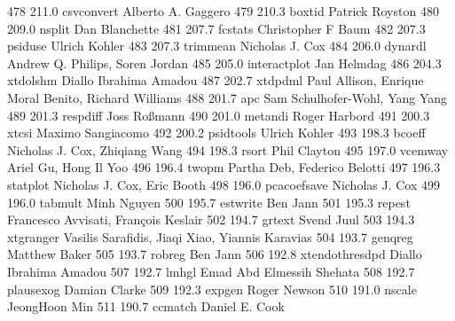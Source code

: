    478    211.0    csvconvert    Alberto A. Gaggero                      
   479    210.3    boxtid        Patrick Royston                         
   480    209.0    nsplit        Dan Blanchette                          
   481    207.7    fcstats       Christopher F Baum                      
   482    207.3    psiduse       Ulrich Kohler                           
   483    207.3    trimmean      Nicholas J. Cox                         
   484    206.0    dynardl       Andrew Q. Philips, Soren Jordan         
   485    205.0    interactplot  Jan Helmdag                             
   486    204.3    xtdolshm      Diallo Ibrahima Amadou                  
   487    202.7    xtdpdml       Paul Allison, Enrique Moral Benito,     
                                   Richard Williams                        
   488    201.7    apc           Sam Schulhofer-Wohl, Yang Yang          
   489    201.3    respdiff      Joss Roßmann                           
   490    201.0    metandi       Roger Harbord                           
   491    200.3    xtcsi         Maximo Sangiacomo                       
   492    200.2    psidtools     Ulrich Kohler                           
   493    198.3    bcoeff        Nicholas J. Cox, Zhiqiang Wang          
   494    198.3    rsort         Phil Clayton                            
   495    197.0    vcemway       Ariel Gu, Hong Il Yoo                   
   496    196.4    twopm         Partha Deb, Federico Belotti            
   497    196.3    statplot      Nicholas J. Cox, Eric Booth             
   498    196.0    pcacoefsave   Nicholas J. Cox                         
   499    196.0    tabmult       Minh Nguyen                             
   500    195.7    estwrite      Ben Jann                                
   501    195.3    repest        Francesco Avvisati, François Keslair   
   502    194.7    grtext        Svend Juul                              
   503    194.3    xtgranger     Vasilis Sarafidis, Jiaqi Xiao, Yiannis  
                                   Karavias                                
   504    193.7    genqreg       Matthew Baker                           
   505    193.7    robreg        Ben Jann                                
   506    192.8    xtendothresdpd  Diallo Ibrahima Amadou                  
   507    192.7    lmhgl         Emad Abd Elmessih Shehata               
   508    192.7    plausexog     Damian Clarke                           
   509    192.3    expgen        Roger Newson                            
   510    191.0    nscale        JeongHoon Min                           
   511    190.7    ccmatch       Daniel E. Cook                          

